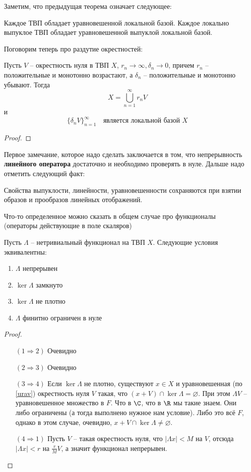\documentclass[11pt]{article}
\begin{document}
Заметим, что предыдущая теорема означает следующее:
\begin{remark}
Каждое ТВП обладает уравновешенной локальной базой. Каждое локально выпуклое ТВП обладает уравновешенной выпуклой локальной базой.
\end{remark}
Поговорим теперь про раздутие окрестностей:
\begin{remark}
Пусть $V$ -- окрестность нуля в ТВП $X$, $r_n \to \infty, \delta_n \to 0$, причем $r_n$ -- положительные и монотонно возрастают, а $\delta_n$ -- положительные и монотонно убывают. Тогда
    $$X = \bigcup_{n = 1}^\infty r_nV$$
    и $$\{\delta_n V\}_{n = 1}^\infty \quad \text{является локальной базой }X$$
\end{remark}
\begin{proof}

\end{proof}
Первое замечание, которое надо сделать заключается в том, что непрерывность \textbf{линейного оператора} достаточно и необходимо проверять в нуле.
Дальше надо отметить следующий факт:
\begin{remark}
Свойства выпуклости, линейности, уравновешенности сохраняются при взятии образов и прообразов линейных отображений.
\end{remark}
Что-то определенное можно сказать в общем случае про функционалы (операторы действующие в поле скаляров)
\begin{theorem}
    Пусть $\Lambda$ -- нетривиальный функционал на ТВП $X$. Следующие условия эквивалентны:
    \begin{enumerate}
        \item $\Lambda$ непрерывен
        \item $\ker \Lambda$ замкнуто
        \item $\ker \Lambda$ не плотно
        \item $\Lambda$ финитно ограничен в нуле
    \end{enumerate}
\end{theorem}
\begin{proof}\ \\
\begin{enumerate}
    \item[$(1\Rightarrow 2)$] Очевидно
    \item[$(2\Rightarrow 3)$] Очевидно
    \item[$(3 \Rightarrow 4)$] Если $\ker \Lambda$ не плотно, существуют $x \in X$ и  уравновешенная (по \ref{urav}) окрестность нуля $V$ такая, что
        $(x+V) \cap \ker \Lambda = \varnothing$. При этом $\Lambda V$ -- уравновешенное множество в $F$. Что в $\C$, что в $\R$ мы такие знаем. Они либо ограничены (а тогда выполнено нужное нам условие).
    Либо это всё $F$, однако в этом случае, очевидно, $x + V \cap \ker \Lambda \neq \varnothing$.
    \item[$(4 \Rightarrow 1)$] Пусть $V$ -- такая окрестность нуля, что $|\Lambda x|<M$ на $V$, отсюда $|\Lambda x|<r$ на $\frac{r}{M}V$, а значит функционал непрерывен.
\end{enumerate}

\end{proof}
\end{document}
